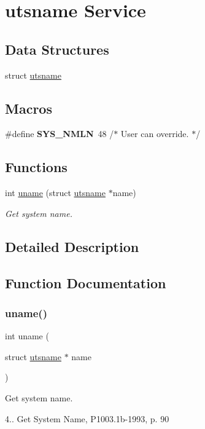 \hypertarget{group__UTSNAME}{}\section{utsname Service}
\label{group__UTSNAME}
\subsection*{Data Structures}
\begin{DoxyCompactItemize}
\item 
struct \mbox{\hyperlink{structutsname}{utsname}}
\end{DoxyCompactItemize}
\subsection*{Macros}
\begin{DoxyCompactItemize}
\item 
\mbox{\label{group__UTSNAME_gac06b4e4833552de0346536c6f974e34f}} 
\#define {\bfseries S\+Y\+S\+\_\+\+N\+M\+LN}~48		/$\ast$ User can override. $\ast$/
\end{DoxyCompactItemize}
\subsection*{Functions}
\begin{DoxyCompactItemize}
\item 
int \mbox{\hyperlink{group__UTSNAME_ga1ad7a68f28b58669758da1b12061a81f}{uname}} (struct \mbox{\hyperlink{structutsname}{utsname}} $\ast$name)
\begin{DoxyCompactList}\small\item\em Get system name. \end{DoxyCompactList}\end{DoxyCompactItemize}


\subsection{Detailed Description}


\subsection{Function Documentation}
\mbox{\label{group__UTSNAME_ga1ad7a68f28b58669758da1b12061a81f}} 
\subsubsection{\texorpdfstring{uname()}{uname()}}
{\footnotesize\ttfamily int uname (\begin{DoxyParamCaption}\item[{struct \mbox{\hyperlink{structutsname}{utsname}} $\ast$}]{name }\end{DoxyParamCaption})}



Get system name. 

4.. Get System Name, P1003.\+1b-\/1993, p. 90 